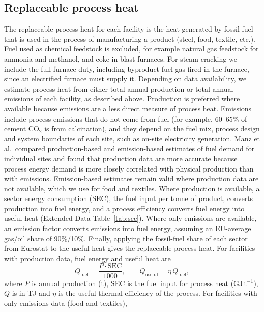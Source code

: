 \documentclass[11pt]{article}
\begin{document}
\subsection*{Replaceable process heat}
The replaceable process heat for each facility is the heat generated by fossil fuel that is used in the process of manufacturing a product (steel, food, textile, etc.). Fuel used as chemical feedstock is excluded, for example natural gas feedstock for ammonia and methanol, and coke in blast furnaces. For steam cracking we include the full furnace duty, including byproduct fuel gas fired in the furnace, since an electrified furnace must supply it. Depending on data availability, we estimate process heat from either total annual production or total annual emissions of each facility, as described above. Production is preferred where available because emissions are a less direct measure of process heat. Emissions include process emissions that do not come from fuel (for example, 60--65\% of cement CO$_2$ is from calcination), and they depend on the fuel mix, process design and system boundaries of each site, such as on-site electricity generation. Manz et al.\ compared production-based and emission-based estimates of fuel demand for individual sites and found that production data are more accurate because process energy demand is more closely correlated with physical production than with emissions\cite{manz2018}. Emission-based estimates remain valid where production data are not available, which we use for food and textiles. Where production is available, a sector energy consumption (SEC)\cite{hotmaps2018}, the fuel input per tonne of product, converts production into fuel energy, and a process efficiency converts fuel energy into useful heat (Extended Data Table~\ref{tab:sec}). Where only emissions are available, an emission factor\cite{ipcc2006stationary} converts emissions into fuel energy, assuming an EU-average gas/oil share of 90\%/10\%\cite{eurostat_nrg_d_indq}. Finally, applying the fossil-fuel share of each sector from Eurostat\cite{eurostat_nrg_d_indq_n} to the useful heat gives the replaceable process heat. For facilities with production data, fuel energy and useful heat are
\begin{equation}
Q_{\mathrm{fuel}} = \frac{P \cdot \mathrm{SEC}}{1000}, \qquad Q_{\mathrm{useful}} = \eta\, Q_{\mathrm{fuel}},
\end{equation}
where $P$ is annual production (t), SEC is the fuel input for process heat (GJ\,t$^{-1}$), $Q$ is in TJ and $\eta$ is the useful thermal efficiency of the process. For facilities with only emissions data (food and textiles),
\end{document}
